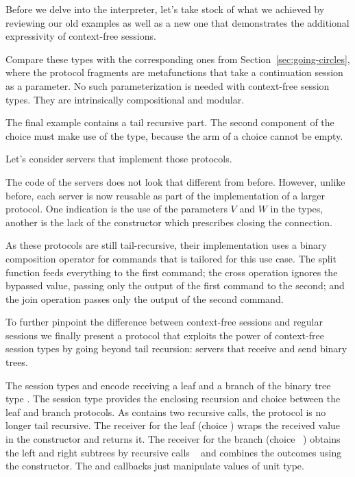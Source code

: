 \documentclass[acmsmall,screen]{acmart}
\begin{document}
Before we delve into the interpreter, let's take stock of what we
achieved by reviewing our old examples as well as a new one that
demonstrates the additional expressivity of context-free sessions.
\cstBinaryp

Compare these types with the corresponding ones from
Section~\ref{sec:going-circles}, where the protocol fragments are
metafunctions that take a continuation session as a parameter. No such
parameterization is needed with context-free session types. They are
intrinsically compositional and modular.

The final example {\Amanyunaryp} contains a tail recursive part. The
second component of the choice must make use of the {\Atcfskip} type,
because the arm of a choice cannot be empty.

Let's consider servers that implement those protocols.
\cstCmdExamples

The code of the servers does not look that different from
before. However, unlike before, each server is now reusable as part of
the implementation of a larger protocol. One indication is the use of
the parameters $V$ and $W$ in the types, another is the lack of the
{\ACCLOSE} constructor which prescribes closing the connection.

As these protocols are still tail-recursive, their implementation uses
a binary composition operator for commands that is tailored for this
use case. The split function feeds everything to the first command; the
cross operation ignores the bypassed value, passing only the output of
the first command to the second; and the join operation passes only
the output of the second command.
\cstTailComposition


To further pinpoint the difference between context-free sessions and
regular sessions we finally present a protocol that
exploits the power of context-free session types by going beyond tail
recursion: servers that receive and send binary trees. 
\cstTreep

The session types {\Aleafp} and {\Abranchp} encode receiving a leaf and
a branch of the binary tree type {\AIntTree}. The session type
{\Atreep} provides the enclosing recursion and choice between the leaf
and branch protocols. As {\Abranchp} contains two recursive calls,
the protocol {\Atreep} is no longer tail recursive.
\cstRecvTree
The receiver for the leaf (choice {\Azero}) wraps the received value in the {\ACLeaf}
constructor and returns it.
The receiver for the branch (choice {\Asuc~\Azero}) obtains the left and right subtrees by
recursive calls {\ACONTINUE~\Azero} and combines the outcomes using
the {\ACBranch} constructor. The {\Asplit} and {\Across} callbacks
just manipulate values of unit type.
\end{document}
